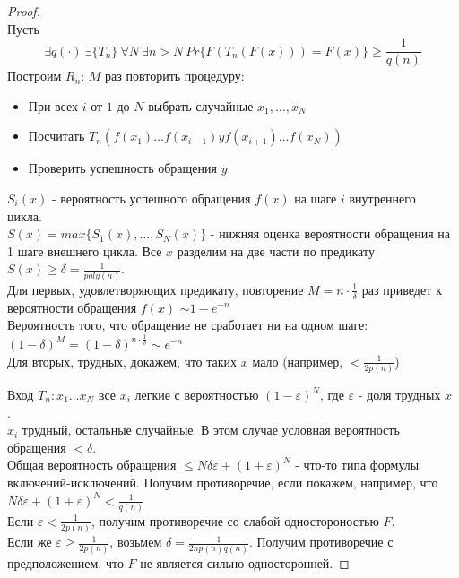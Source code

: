 \documentclass[a4paper]{article}
\theoremstyle{definition}
\theoremstyle{plain}
\begin{document}
\begin{proof}~\\
	Пусть 
	$$
		\exists q(\cdot)\ \exists \{T_n\}\ \forall N\ \exists n > N\ Pr\{F(T_n(F(x))) = F(x)\} \ge \frac{1}{q(n)}
	$$
	Построим $R_n$:
	$M$ раз повторить процедуру:
	\begin{itemize}
		\item При всех $i$ от $1$ до $N$ выбрать случайные $x_1,\ldots, x_N$
		\item Посчитать $T_n(f(x_1)\ldots f(x_{i - 1})y f(x_{i + 1})\ldots f(x_N))$
		\item Проверить успешность обращения $y$.
	\end{itemize}
	
	\noindent $S_i(x)$ - вероятность успешного обращения $f(x)$ на шаге $i$ внутреннего цикла.~\\
	\noindent $S(x) = max\{S_1(x), \ldots, S_N(x) \}$ - нижняя оценка вероятности обращения на 1 шаге внешнего цикла.
	Все $x$ разделим на две части по предикату $S(x) \ge \delta = \frac{1}{poly(n)}$.~\\
	
	\noindent Для первых, удовлетворяющих предикату, повторение $M = n \cdot \frac{1}{\delta}$ раз приведет к вероятности обращения $f(x)$ $\sim 1 - e^{-n}$~\\
	\noindent Вероятность того, что обращение не сработает ни на одном шаге: $(1 - \delta)^M = (1 - \delta)^{n\cdot \frac{1}{\delta}} \sim e^{-n}$~\\
	
	\noindent Для вторых, трудных, докажем, что таких $x$ мало (например, $< \frac{1}{2p(n)}$)
	
	\noindent Вход $T_n \colon x_1\ldots x_N$ все $x_i$ легкие с вероятностью $(1 - \varepsilon)^N$, где $\varepsilon$ - доля трудных $x$.~\\
	
	\noindent $x_i$ трудный, остальные случайные. В этом случае условная вероятность обращения $< \delta$.~\\
	
	
	\noindent Общая вероятность обращения $\le N\delta\varepsilon + (1 + \varepsilon)^N$ - что-то типа формулы включений-исключений.
	Получим противоречие, если покажем, например, что $N\delta\varepsilon + (1 + \varepsilon)^N < \frac{1}{q(n)}$~\\
	
	\noindent Если $\varepsilon < \frac{1}{2p(n)}$, получим противоречие со слабой одностороностью $F$.~\\
	
	\noindent Если же $\varepsilon \ge \frac{1}{2p(n)}$, возьмем $\delta = \frac{1}{2np(n)q(n)}$. Получим противоречие с предположением, что $F$ не является сильно односторонней.
	
\end{proof}
\end{document}
